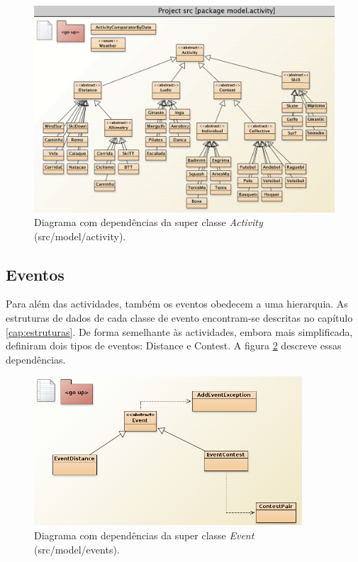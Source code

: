\documentclass[a4paper,10pt]{report}
\begin{document}
\begin{figure}
\centering
\includegraphics[width=\textwidth]{diagramaActivities.png}
\caption{Diagrama com dependências da super classe \emph{Activity} (src/model/activity).}
\label{fig:activityDiagram}
\end{figure}

\subsection{Eventos}
\label{subsec:eventosDiagrama}
Para além das actividades, também os eventos obedecem a uma hierarquia.
As estruturas de dados de cada classe de evento encontram-se descritas no capítulo \ref{cap:estruturas}.
De forma semelhante às actividades, embora mais simplificada, definiram dois tipos de eventos: Distance e Contest.
A figura \ref{fig:eventDiagram} descreve essas dependências.

\begin{figure}
\centering
\includegraphics[width=10cm]{events.png}
\caption{Diagrama com dependências da super classe \emph{Event} (src/model/events).}
\label{fig:eventDiagram}
\end{figure}
\end{document}
